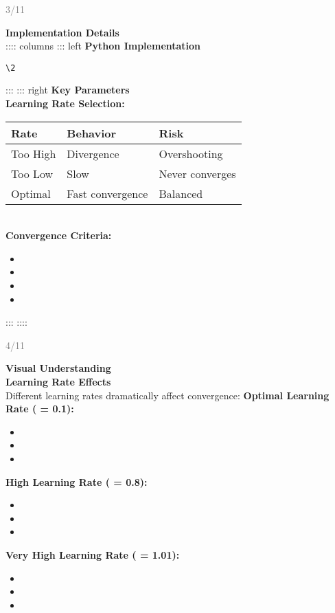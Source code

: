 \documentclass[11pt]{article}
\begin{document}
\vfill
\begin{flushright}
\textcolor{gray}{\small 3/11}
\end{flushright}

\newpage

\textbf{\huge Implementation Details}\\[0.5cm]
:::: columns
::: left
\textbf{\Large Python Implementation}\\[0.3cm]
\begin{lstlisting}
\2
\end{lstlisting}
:::
::: right
\textbf{\Large Key Parameters}\\[0.3cm]
\textbf{Learning Rate Selection:}
\begin{center}
\begin{tabular}{lll}
\hline
\textbf{Rate} & \textbf{Behavior} & \textbf{Risk} \\
\hline
Too High & Divergence & Overshooting \\
Too Low & Slow & Never converges \\
Optimal & Fast convergence & Balanced \\
\hline
\end{tabular}
\end{center}\\
\textbf{Convergence Criteria:}
\begin{itemize}
\item \1
\item \1
\item \1
\item \1
\end{itemize}
:::
::::

\vfill
\begin{flushright}
\textcolor{gray}{\small 4/11}
\end{flushright}

\newpage

\textbf{\huge Visual Understanding}\\[0.5cm]
\textbf{\Large Learning Rate Effects}\\[0.3cm]
Different learning rates dramatically affect convergence:
\textbf{Optimal Learning Rate ( = 0.1):}
\begin{itemize}
\item \1
\item \1
\item \1
\end{itemize}
\textbf{High Learning Rate ( = 0.8):}
\begin{itemize}
\item \1
\item \1
\item \1
\end{itemize}
\textbf{Very High Learning Rate ( = 1.01):}
\begin{itemize}
\item \1
\item \1
\item \1
\end{itemize}
\end{document}
